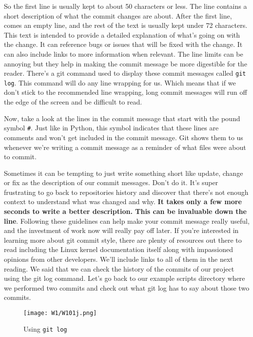	So the first line is usually kept to about 50 characters or less. The line contains a short description of what the commit changes are about. After the first line, comes an empty line, and the rest of the text is usually kept under 72 characters. This text is intended to provide a detailed explanation of what's going on with the change. It can reference bugs or issues that will be fixed with the change. It can also include links to more information when relevant. The line limits can be annoying but they help in making the commit message be more digestible for the reader. 
	There's a git command used to display these commit messages called \texttt{git log}. This command will do any line wrapping for us. Which means that if we don't stick to the recommended line wrapping, long commit messages will run off the edge of the screen and be difficult to read. 
	
	Now, take a look at the lines in the commit message that start with the pound symbol \verb|#|.
	Just like in Python, this symbol indicates that these lines are comments and won't get included in the commit message. Git shows them to us whenever we're writing a commit message as a reminder of what files were about to commit. 
	
	Sometimes it can be tempting to just write something short like update, change or fix as the description of our commit messages. Don't do it. It's super frustrating to go back to repositories history and discover that there's not enough context to understand what was changed and why. \textbf{It takes only a few more seconds to write a better description. This can be invaluable down the line}. Following these guidelines can help make your commit message really useful, and the investment of work now will really pay off later.
	If you're interested in learning more about git commit style, there are plenty of resources out there to read including the Linux kernel documentation itself along with impassioned opinions from other developers. We'll include links to all of them in the next reading. We said that we can check the history of the commits of our project using the git log command. Let's go back to our example scripts directory where we performed two commits and check out what git log has to say about those two commits.
	
	\begin{figure} 
		\caption{Using \texttt{git log}}
		\centering
		\texttt{[image: W1/W101j.png]}
		\label{W101j}
	\end{figure}
	
